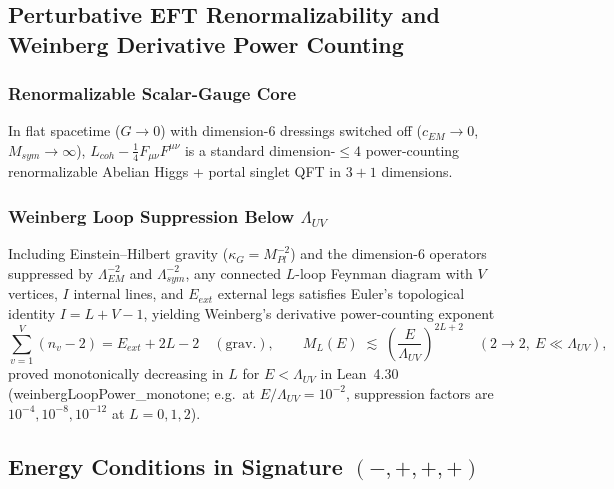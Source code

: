 \documentclass[american,11pt,letterpaper]{article}
\def\mathcal#1{#1}%
\def\mathrm#1{#1}%
\def\texttt#1{#1}%
\begin{document}
\subsection{Perturbative EFT Renormalizability and Weinberg Derivative Power Counting}

\subsubsection{Renormalizable Scalar-Gauge Core}

In flat spacetime ($G \to 0$) with dimension-6 dressings switched off ($c_{\mathrm{EM}} \to 0$, $M_{\mathrm{sym}} \to \infty$), $\mathcal{L}_{\mathrm{coh}} - \frac{1}{4}F_{\mu\nu}F^{\mu\nu}$ is a standard dimension-$\le 4$ power-counting renormalizable Abelian Higgs + portal singlet QFT in $3+1$ dimensions.

\subsubsection{Weinberg Loop Suppression Below $\Lambda_{\mathrm{UV}}$}

Including Einstein--Hilbert gravity ($\kappa_G = M_{\mathrm{Pl}}^{-2}$) and the dimension-6 operators suppressed by $\Lambda_{\mathrm{EM}}^{-2}$ and $\Lambda_{\mathrm{sym}}^{-2}$, any connected $L$-loop Feynman diagram with $V$ vertices, $I$ internal lines, and $E_{\mathrm{ext}}$ external legs satisfies Euler's topological identity $I = L + V - 1$, yielding Weinberg's derivative power-counting exponent
\begin{equation}
\sum_{v=1}^V (n_v - 2) = E_{\mathrm{ext}} + 2L - 2 \quad (\text{grav.}),
\qquad
\mathcal{M}_L(E) \;\lesssim\; \left(\frac{E}{\Lambda_{\mathrm{UV}}}\right)^{2L + 2}
\quad (2 \to 2,\ E \ll \Lambda_{\mathrm{UV}}),
\label{eq:weinberg_power_counting_sec19}
\end{equation}
proved monotonically decreasing in $L$ for $E < \Lambda_{\mathrm{UV}}$ in Lean~4.30 (\texttt{weinberg\allowbreak{}Loop\allowbreak{}Power\_\allowbreak{}monotone}; e.g.\ at $E/\Lambda_{\mathrm{UV}} = 10^{-2}$, suppression factors are $10^{-4}, 10^{-8}, 10^{-12}$ at $L = 0, 1, 2$).

\subsection{Energy Conditions in Signature $(-,+,+,+)$}
\end{document}
